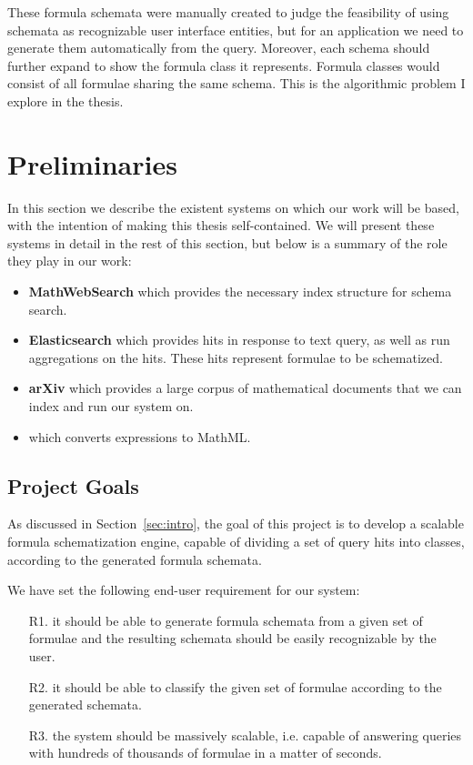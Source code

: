 These formula schemata were manually created to judge the feasibility of using
schemata as recognizable user interface entities, but for an application we
need to generate them automatically from the query. Moreover, each schema
should further expand to show the formula class it represents. Formula classes
would consist of all formulae sharing the same schema. This is the algorithmic
problem I explore in the thesis.


\section{Preliminaries}\label{sec:prelim}

In this section we describe the existent systems on which our work will be
based, with the intention of making this thesis self-contained. We will
present these systems in detail in the rest of this section, but
below is a summary of the role they play in our work:
\begin{itemize}
\item \textbf{MathWebSearch} which provides the necessary index structure
for schema search.
\item \textbf{Elasticsearch} which provides hits in response to text query,
    as well as run aggregations on the hits.
    These hits represent formulae to be schematized.
\item \textbf{arXiv} which provides a large corpus of mathematical documents
    that we can index and run our system on.
\item \textbf{\latexml} which converts {\latex} expressions to MathML.
\end{itemize}

\subsection{Project Goals}\label{subsec:prelim:goals}
As discussed in Section~\ref{sec:intro}, the goal of this project is to
develop a scalable formula schematization engine, capable of dividing a set of
query hits into classes, according to the generated formula schemata.

We have set the following end-user requirement for our system:
\begin{enumerate}
    \item[R1.] it should be able to generate formula schemata from a given set
        of formulae and the resulting schemata should be easily recognizable by
        the user.
    \item[R2.] it should be able to classify the given set of formulae
        according to the generated schemata.
    \item[R3.] the system should be massively scalable, i.e. capable of
        answering queries with hundreds of thousands of formulae in a matter of
        seconds.
\end{enumerate}

